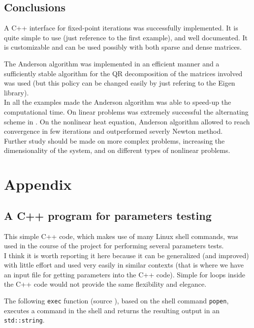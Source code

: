 \documentclass[12pt]{article}
\begin{document}
			\subsection{Conclusions}
			A C++ interface for fixed-point iterations was successfully implemented. It is quite simple
			to use (just reference to the first example), and well documented. It is customizable and can be
			used possibly with both sparse and dense matrices.
			
			The Anderson algorithm was implemented in
			an efficient manner and a sufficiently stable algorithm for the QR decomposition of the
			matrices involved was used (but this policy can be changed easily by just refering to the Eigen
			library).\\
			In all the examples made the Anderson algorithm was able to speed-up the computational
			time.	On linear problems was extremely successful the alternating scheme in \cite{Pratapa}.
			On the nonlinear heat equation, Anderson algorithm allowed to reach convergence in few
			iterations and outperformed severly Newton method.\\
			Further study should be made on more complex problems, increasing the dimensionality
			of the system, and on different types of nonlinear problems.

			\appendix
			\section{Appendix}
			\subsection{A C++ program for parameters testing}
			This simple C++ code, which makes use of many Linux shell commands, was used in
			the course of the project for performing several parameters tests.\\ 
			I think it is worth reporting it here because it can be generalized (and improved) with little
			effort and used very easily in similar contexts (that is where we have an input file
			for getting parameters into the C++ code). Simple for loops inside the C++ code would not provide
			the same flexibility and elegance.
			
			The following \verb|exec| function (source \cite{stack}), based on the shell command \verb|popen|, 
			executes a command in the shell and returns the resulting output
			in an \verb|std::string|.
			
\end{document}
